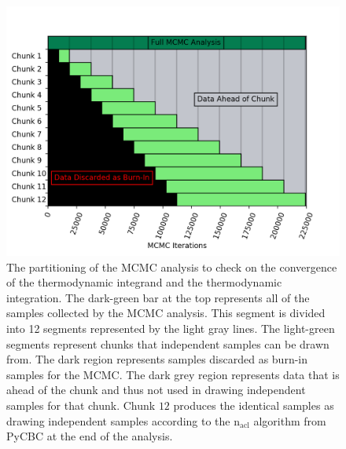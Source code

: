 \begin{figure}[th]
\centering
\includegraphics[width=1.0\columnwidth]{figs/chapter6/convergence_segmentation_lvc_sim.png}
\caption{The partitioning of the MCMC analysis to check on the convergence of the thermodynamic integrand and the thermodynamic integration. The dark-green bar at the top represents all of the samples collected by the MCMC analysis. This segment is divided into 12 segments represented by the light gray lines. The light-green segments represent chunks that independent samples can be drawn from. The dark region represents samples discarded as burn-in samples for the MCMC. The dark grey region represents data that is ahead of the chunk and thus not used in drawing independent samples for that chunk. Chunk $12$ produces the identical samples as drawing independent samples according to the $\mathrm{n_{acl}}$ algorithm from PyCBC at the end of the analysis.}
\label{fig:nacl_segments}
\end{figure}

